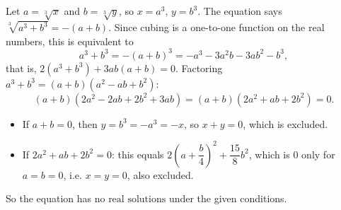 Let $a=\sqrt[3]{x}$ and $b=\sqrt[3]{y}$, so $x=a^3$, $y=b^3$. The equation says $\sqrt[3]{a^3+b^3}=-(a+b)$. Since cubing is a one-to-one function on the real numbers, this is equivalent to
\[a^3+b^3=-(a+b)^3=-a^3-3a^2b-3ab^2-b^3,\]
that is, $2(a^3+b^3)+3ab(a+b)=0$. Factoring $a^3+b^3=(a+b)(a^2-ab+b^2)$:
\[(a+b)\left(2a^2-2ab+2b^2+3ab\right)=(a+b)\left(2a^2+ab+2b^2\right)=0.\]
\begin{itemize}
\item If $a+b=0$, then $y=b^3=-a^3=-x$, so $x+y=0$, which is excluded.
\item If $2a^2+ab+2b^2=0$: this equals $2\left(a+\dfrac b4\right)^2+\dfrac{15}{8}b^2$, which is $0$ only for $a=b=0$, i.e. $x=y=0$, also excluded.
\end{itemize}
So the equation has $\boxed{\text{no real solutions}}$ under the given conditions.
